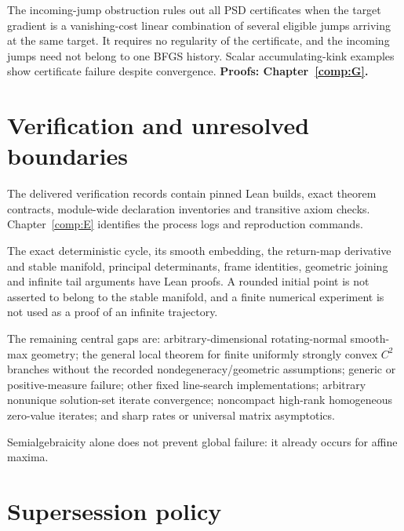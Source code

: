 The incoming-jump obstruction rules out all PSD certificates when the target gradient is a vanishing-cost linear combination of several eligible jumps arriving at the same target. It requires no regularity of the certificate, and the incoming jumps need not belong to one BFGS history. Scalar accumulating-kink examples show certificate failure despite convergence. \textbf{Proofs: Chapter~\ref{comp:G}.}



\section{Verification and unresolved boundaries}\label{verification-and-unresolved-boundaries}

The delivered verification records contain pinned Lean builds, exact theorem contracts, module-wide declaration inventories and transitive axiom checks. Chapter~\ref{comp:E} identifies the process logs and reproduction commands.

The exact deterministic cycle, its smooth embedding, the return-map derivative and stable manifold, principal determinants, frame identities, geometric joining and infinite tail arguments have Lean proofs. A rounded initial point is not asserted to belong to the stable manifold, and a finite numerical experiment is not used as a proof of an infinite trajectory.

The remaining central gaps are: arbitrary-dimensional rotating-normal smooth-max geometry; the general local theorem for finite uniformly strongly convex \(C^2\) branches without the recorded nondegeneracy/geometric assumptions; generic or positive-measure failure; other fixed line-search implementations; arbitrary nonunique solution-set iterate convergence; noncompact high-rank homogeneous zero-value iterates; and sharp rates or universal matrix asymptotics.

Semialgebraicity alone does not prevent global failure: it already occurs for affine maxima.



\clearpage
\section{Supersession policy}\label{supersession-policy}

